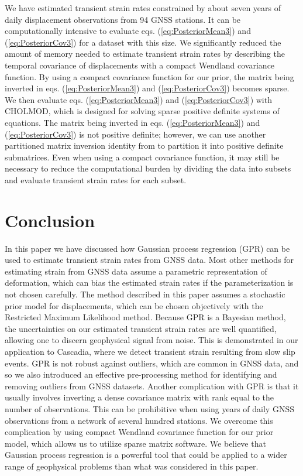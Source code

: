 \documentclass[10pt,letter]{article}
\begin{document}
We have estimated transient strain rates constrained by about seven years of daily displacement observations from 94 GNSS stations. It can be computationally intensive to evaluate eqs. (\ref{eq:PosteriorMean3}) and (\ref{eq:PosteriorCov3}) for a dataset with this size. We significantly reduced the amount of memory needed to estimate transient strain rates by describing the temporal covariance of displacements with a compact Wendland covariance function. By using a compact covariance function for our prior, the matrix being inverted in eqs. (\ref{eq:PosteriorMean3}) and (\ref{eq:PosteriorCov3}) becomes sparse. We then evaluate eqs. (\ref{eq:PosteriorMean3}) and (\ref{eq:PosteriorCov3}) with CHOLMOD, which is designed for solving sparse positive definite systems of equations. The matrix being inverted in eqs. (\ref{eq:PosteriorMean3}) and (\ref{eq:PosteriorCov3}) is not positive definite; however, we can use another partitioned matrix inversion identity from \citet[e.g.,][]{Press2007} to partition it into positive definite submatrices. Even when using a compact covariance function, it may still be necessary to reduce the computational burden by dividing the data into subsets and evaluate transient strain rates for each subset.   

\section{Conclusion}\label{sec:Conclusion}
In this paper we have discussed how Gaussian process regression (GPR) can be used to estimate transient strain rates from GNSS data. Most other methods for estimating strain from GNSS data assume a parametric representation of deformation, which can bias the estimated strain rates if the parameterization is not chosen carefully. The method described in this paper assumes a stochastic prior model for displacements, which can be chosen objectively with the Restricted Maximum Likelihood method. Because GPR is a Bayesian method, the uncertainties on our estimated transient strain rates are well quantified, allowing one to discern geophysical signal from noise. This is demonstrated in our application to Cascadia, where we detect transient strain resulting from slow slip events. GPR is not robust against outliers, which are common in GNSS data, and so we also introduced an effective pre-processing method for identifying and removing outliers from GNSS datasets. Another complication with GPR is that it usually involves inverting a dense covariance matrix with rank equal to the number of observations. This can be prohibitive when using years of daily GNSS observations from a network of several hundred stations.  We overcome this complication by using compact Wendland covariance function for our prior model, which allows us to utilize sparse matrix software. We believe that Gaussian process regression is a powerful tool that could be applied to a wider range of geophysical problems than what was considered in this paper.   
\end{document}
